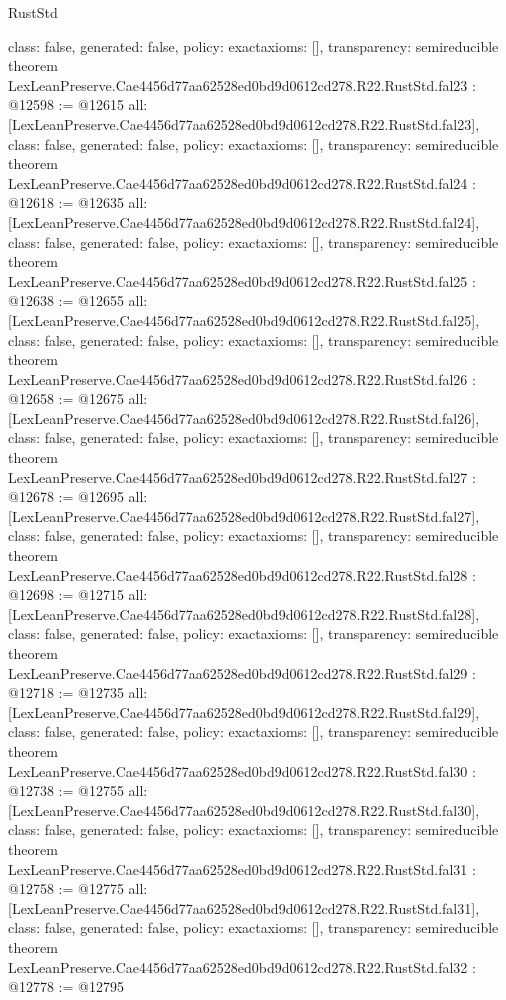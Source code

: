 \begin{lexlean}{RustStd}
\begin{coremodule}
{  class: false,
  generated: false,
  policy: exact{axioms: []},
  transparency: semireducible
}
theorem LexLeanPreserve.Cae4456d77aa62528ed0bd9d0612cd278.R22.RustStd.fal23 : @12598 := @12615 {
  all: [LexLeanPreserve.Cae4456d77aa62528ed0bd9d0612cd278.R22.RustStd.fal23],
  class: false,
  generated: false,
  policy: exact{axioms: []},
  transparency: semireducible
}
theorem LexLeanPreserve.Cae4456d77aa62528ed0bd9d0612cd278.R22.RustStd.fal24 : @12618 := @12635 {
  all: [LexLeanPreserve.Cae4456d77aa62528ed0bd9d0612cd278.R22.RustStd.fal24],
  class: false,
  generated: false,
  policy: exact{axioms: []},
  transparency: semireducible
}
theorem LexLeanPreserve.Cae4456d77aa62528ed0bd9d0612cd278.R22.RustStd.fal25 : @12638 := @12655 {
  all: [LexLeanPreserve.Cae4456d77aa62528ed0bd9d0612cd278.R22.RustStd.fal25],
  class: false,
  generated: false,
  policy: exact{axioms: []},
  transparency: semireducible
}
theorem LexLeanPreserve.Cae4456d77aa62528ed0bd9d0612cd278.R22.RustStd.fal26 : @12658 := @12675 {
  all: [LexLeanPreserve.Cae4456d77aa62528ed0bd9d0612cd278.R22.RustStd.fal26],
  class: false,
  generated: false,
  policy: exact{axioms: []},
  transparency: semireducible
}
theorem LexLeanPreserve.Cae4456d77aa62528ed0bd9d0612cd278.R22.RustStd.fal27 : @12678 := @12695 {
  all: [LexLeanPreserve.Cae4456d77aa62528ed0bd9d0612cd278.R22.RustStd.fal27],
  class: false,
  generated: false,
  policy: exact{axioms: []},
  transparency: semireducible
}
theorem LexLeanPreserve.Cae4456d77aa62528ed0bd9d0612cd278.R22.RustStd.fal28 : @12698 := @12715 {
  all: [LexLeanPreserve.Cae4456d77aa62528ed0bd9d0612cd278.R22.RustStd.fal28],
  class: false,
  generated: false,
  policy: exact{axioms: []},
  transparency: semireducible
}
theorem LexLeanPreserve.Cae4456d77aa62528ed0bd9d0612cd278.R22.RustStd.fal29 : @12718 := @12735 {
  all: [LexLeanPreserve.Cae4456d77aa62528ed0bd9d0612cd278.R22.RustStd.fal29],
  class: false,
  generated: false,
  policy: exact{axioms: []},
  transparency: semireducible
}
theorem LexLeanPreserve.Cae4456d77aa62528ed0bd9d0612cd278.R22.RustStd.fal30 : @12738 := @12755 {
  all: [LexLeanPreserve.Cae4456d77aa62528ed0bd9d0612cd278.R22.RustStd.fal30],
  class: false,
  generated: false,
  policy: exact{axioms: []},
  transparency: semireducible
}
theorem LexLeanPreserve.Cae4456d77aa62528ed0bd9d0612cd278.R22.RustStd.fal31 : @12758 := @12775 {
  all: [LexLeanPreserve.Cae4456d77aa62528ed0bd9d0612cd278.R22.RustStd.fal31],
  class: false,
  generated: false,
  policy: exact{axioms: []},
  transparency: semireducible
}
theorem LexLeanPreserve.Cae4456d77aa62528ed0bd9d0612cd278.R22.RustStd.fal32 : @12778 := @12795 {
}
\end{coremodule}
\end{lexlean}

